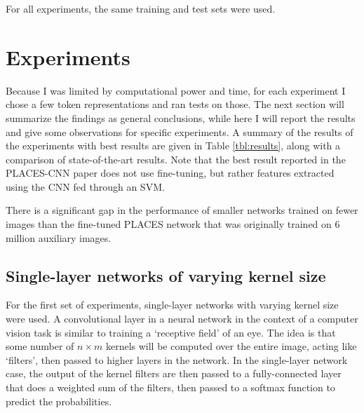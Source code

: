 \documentclass[10pt]{article}
\begin{document}
For all experiments, the same training and test sets were used. 

\section{Experiments}

Because I was limited by computational power and time, for each experiment I chose a few token representations and ran tests on those. The next section will summarize the findings as general conclusions, while here I will report the results and give some observations for specific experiments. A summary of the results of the experiments with best results are given in Table \ref{tbl:results}, along with a comparison of state-of-the-art results. Note that the best result reported in the PLACES-CNN paper \cite{zhou_learning_2014} does not use fine-tuning, but rather features extracted using the CNN fed through an SVM.

\begin{table}[!ht]
\centering
{}
\caption{Summary of top-1 and top-5 accuracy results on the test set}
\label{tbl:results}
\end{table}

There is a significant gap in the performance of smaller networks trained on fewer images than the fine-tuned PLACES network that was originally trained on 6 million auxiliary images.

\subsection{Single-layer networks of varying kernel size}

For the first set of experiments, single-layer networks with varying kernel size were used. A convolutional layer in a neural network in the context of a computer vision task is similar to training a `receptive field' of an eye. The idea is that some number of $n \times m$ kernels will be computed over the entire image, acting like `filters', then passed to higher layers in the network. In the single-layer network case, the output of the kernel filters are then passed to a fully-connected layer that does a weighted sum of the filters, then passed to a softmax function to predict the probabilities. 
\end{document}
